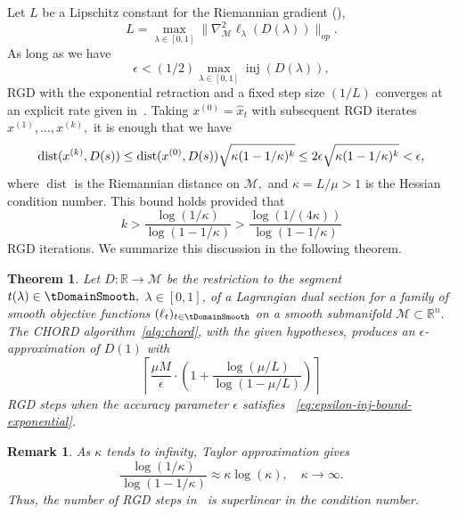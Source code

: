 \documentclass{article}
\numberwithin{equation}{section}
\newcommand{\dist}{{\rm dist}}
\newcommand{\R}{\mathbb{R}}
\newtheorem{theorem}{Theorem}[section]
\newtheorem{remark}{Remark}
\newcommand{\cM}{{\mathcal{M}}}
\begin{document}
Let $L$ be a Lipschitz constant for the Riemannian gradient (\cite[Corollary 10.47]{boumal}),
\begin{equation}\label{eq:Lipschitz-riemannian-gradient-constant}
L = 
\displaystyle\max_{\lambda \in [0,1]} \| \nabla_\cM^2 \ell_\lambda  (D(\lambda)) \|_{op} . 
\end{equation}
As long as we have
\begin{equation}\label{eq:epsilon-inj-bound-exponential}
    \epsilon < 
(1/2) \max_{\lambda \in [0,1]} \operatorname{inj} (D(\lambda )),
    \end{equation}
   RGD with the exponential retraction and a fixed step size $(1/L)$ converges at an explicit rate given in~\cite[Theorem 11.29]{boumal}. 
   Taking $x^{(0)}=\hat{x}_t$ with subsequent RGD iterates $x^{(1)}, \ldots , x^{(k)},$ it is enough that we have
   \[
   \operatorname{dist} (x^{(k)}, D(s)) 
\le 
\dist (x^{(0)}, D(s))
\sqrt{\kappa (1 - 1/\kappa )^k } 
\le 
 2 \epsilon
\sqrt{\kappa (1 - 1/\kappa )^k } 
< \epsilon ,
\]
where $\operatorname{dist}$ is the Riemannian distance on $\cM ,$
and $\kappa = L / \mu > 1$ is the Hessian condition number.
This bound holds provided that
\begin{equation}\label{eq:rgd-iterations-bound-exponential}
k >
\displaystyle\frac{\log (1 / \kappa  )}{\log (1 - 1/\kappa )}
>
\displaystyle\frac{\log (1 / (4 \kappa ) )}{\log (1 - 1/\kappa )}
   \end{equation}
RGD iterations.
We summarize this discussion in the following theorem.
\begin{theorem}\label{thm:homotopy-alg}
Let $D: \mathbb{R} \to \cM$ be the restriction to the segment $t(\lambda) \in \tDomainSmooth,$ $\lambda \in [0,1]$, of a Lagrangian dual section for a family of smooth objective functions $(\ell_t )_{t\in \tDomainSmooth}$ on a smooth submanifold $\cM\subset \R^n.$
The CHORD algorithm~\ref{alg:chord}, with the given hypotheses, produces an $\epsilon$-approximation of $D(1)$ with 
\begin{equation}\label{eq:total-gd-iters-exponential}
\left\lceil 
\displaystyle\frac{\mu M}{\epsilon} \cdot \left( 1 + 
\displaystyle\frac{ \log (\mu / L)}{\log (1 - \mu / L )} \right)
\right\rceil 
\end{equation}
RGD steps when the accuracy parameter $\epsilon $ satisfies ~\eqref{eq:epsilon-inj-bound-exponential}.
\end{theorem}

\begin{remark}
As  $\kappa $ tends to infinity, Taylor approximation gives
\[
\displaystyle\frac{\log ( 1 / \kappa )}{\log (1- 1/\kappa ) } 
\approx 
\kappa \log (\kappa ), 
\quad 
\kappa \to \infty .
\]
Thus, the number of RGD steps in~ is superlinear in the condition number.
\end{remark}
\end{document}
